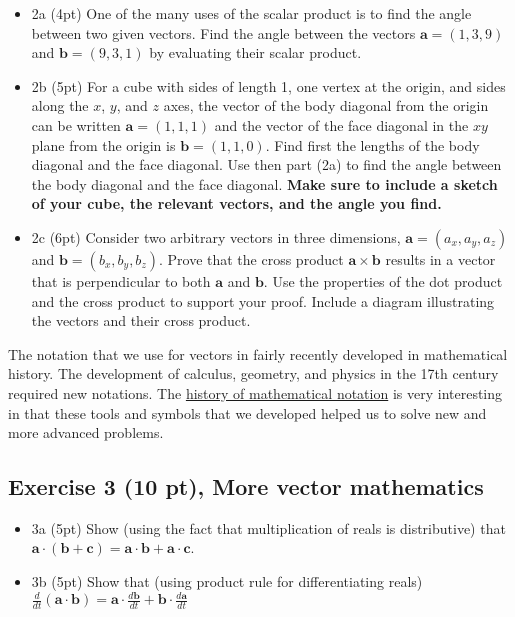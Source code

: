 \documentclass[11pt]{article}
\begin{document}
\begin{itemize}
\item
  2a (4pt) One of the many uses of the scalar product is to find the
  angle between two given vectors. Find the angle between the vectors
  \(\boldsymbol{a}=(1,3,9)\) and \(\boldsymbol{b}=(9,3,1)\) by
  evaluating their scalar product.
\item
  2b (5pt) For a cube with sides of length 1, one vertex at the origin,
  and sides along the \(x\), \(y\), and \(z\) axes, the vector of the
  body diagonal from the origin can be written
  \(\boldsymbol{a}=(1, 1, 1)\) and the vector of the face diagonal in
  the \(xy\) plane from the origin is \(\boldsymbol{b}=(1,1,0)\). Find
  first the lengths of the body diagonal and the face diagonal. Use then
  part (2a) to find the angle between the body diagonal and the face
  diagonal. \textbf{Make sure to include a sketch of your cube, the
  relevant vectors, and the angle you find.}
\item
  2c (6pt) Consider two arbitrary vectors in three dimensions,
  \(\boldsymbol{a}=(a_x, a_y, a_z)\) and
  \(\boldsymbol{b}=(b_x, b_y, b_z)\). Prove that the cross product
  \(\boldsymbol{a} \times \boldsymbol{b}\) results in a vector that is
  perpendicular to both \(\boldsymbol{a}\) and \(\boldsymbol{b}\). Use
  the properties of the dot product and the cross product to support
  your proof. Include a diagram illustrating the vectors and their cross
  product.
\end{itemize}

The notation that we use for vectors in fairly recently developed in
mathematical history. The development of calculus, geometry, and physics
in the 17th century required new notations. The
\href{https://en.wikipedia.org/wiki/History_of_mathematical_notation\#High_division_operators_and_functions}{history
of mathematical notation} is very interesting in that these tools and
symbols that we developed helped us to solve new and more advanced
problems.

    \subsection{Exercise 3 (10 pt), More vector
mathematics}\label{exercise-3-10-pt-more-vector-mathematics}

\begin{itemize}
\item
  3a (5pt) Show (using the fact that multiplication of reals is
  distributive) that
  \(\boldsymbol{a}\cdot(\boldsymbol{b}+\boldsymbol{c})=\boldsymbol{a}\cdot\boldsymbol{b}+\boldsymbol{a}\cdot\boldsymbol{c}\).
\item
  3b (5pt) Show that (using product rule for differentiating reals)
  \(\frac{d}{dt}(\boldsymbol{a}\cdot\boldsymbol{b})=\boldsymbol{a}\cdot\frac{d\boldsymbol{b}}{dt}+\boldsymbol{b}\cdot\frac{d\boldsymbol{a}}{dt}\)
\end{itemize}
\end{document}
